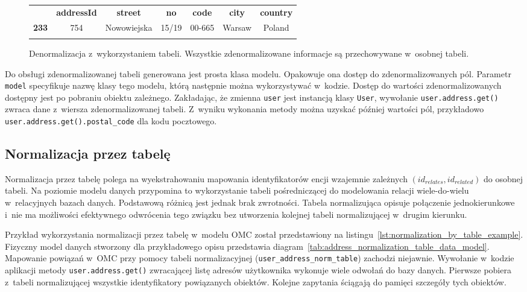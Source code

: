 \begin{figure}[ht!]
	\centering

	\begin{tabular}{|l||c|c|c|c|c|c|}
		\hhline{|-||------|}
		 & \textbf{addressId} & \textbf{street} & \textbf{no} & \textbf{code} & \textbf{city} & \textbf{country} \\
		\hhline{|~||======|}
		\textbf{233} & 754 & Nowowiejska & 15/19 & 00-665 & Warsaw & Poland \\
		\hhline{|-||------|}
	\end{tabular} 

	\caption{Denormalizacja z~wykorzystaniem tabeli. Wszystkie zdenormalizowane informacje są przechowywane w~osobnej tabeli.}
	\label{tab:address_denormalization_by_table_example}
\end{figure}

Do obsługi zdenormalizowanej tabeli generowana jest prosta klasa modelu. Opakowuje ona dostęp do zdenormalizowanych pól. Parametr \verb+model+ specyfikuje nazwę klasy tego modelu, którą następnie można wykorzystywać w~kodzie. Dostęp do wartości zdenormalizowanych dostępny jest po pobraniu obiektu zależnego. Zakładając, że zmienna \verb+user+ jest instancją klasy \verb+User+, wywołanie \verb+user.address.get()+ zwraca dane z~wiersza zdenormalizowanej tabeli. Z~wyniku wykonania metody można uzyskać później wartości pól, przykładowo \verb+user.address.get().postal_code+ dla kodu pocztowego. 

\subsection{Normalizacja przez tabelę}
\label{sec:normalization_by_table}

Normalizacja przez tabelę polega na wyekstrahowaniu mapowania identyfikatorów encji wzajemnie zależnych $(id_{relates}, id_{related})$ do osobnej tabeli. Na poziomie modelu danych przypomina to wykorzystanie tabeli pośredniczącej do modelowania relacji wiele-do-wielu w~relacyjnych bazach danych. Podstawową różnicą jest jednak brak zwrotności. Tabela normalizująca opisuje połączenie jednokierunkowe i~nie ma możliwości efektywnego odwrócenia tego związku bez utworzenia kolejnej tabeli normalizującej w~drugim kierunku.

Przykład wykorzystania normalizacji przez tabelę w~modelu OMC został przedstawiony na listingu~\ref{lst:normalization_by_table_example}. Fizyczny model danych stworzony dla przykładowego opisu przedstawia diagram~\ref{tab:address_normalization_table_data_model}. Mapowanie powiązań w~OMC przy pomocy tabeli normalizacyjnej (\verb+user_address_norm_table+) zachodzi niejawnie. Wywołanie w~kodzie aplikacji metody \verb+user.address.get()+ zwracającej listę adresów użytkownika wykonuje wiele odwołań do bazy danych. Pierwsze pobiera z~tabeli normalizującej wszystkie identyfikatory powiązanych obiektów. Kolejne zapytania ściągają do pamięci szczegóły tych obiektów.

